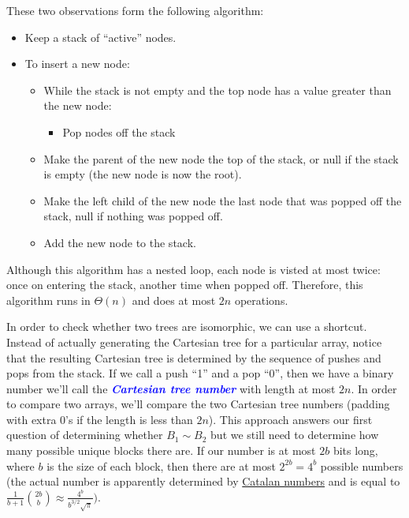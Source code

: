 \documentclass[11pt, oneside]{article}
\newcommand{\emphasis}[1]{\textcolor{blue}{\textbf{\textit{#1}}}}
\begin{document}
These two observations form the following algorithm:
\begin{itemize}
  \item Keep a stack of ``active'' nodes.
  \item To insert a new node:
    \begin{itemize}
      \item While the stack is not empty and the top node has a value greater than the new node:
      \begin{itemize}
        \item Pop nodes off the stack
      \end{itemize}
      \item Make the parent of the new node the top of the stack, or null
      if the stack is empty (the new node is now the root).
      \item Make the left child of the new node the last node that was popped off the stack,
      null if nothing was popped off.
      \item Add the new node to the stack.
    \end{itemize}
\end{itemize}

Although this algorithm has a nested loop, each node is visted at most twice:
once on entering the stack, another time when popped off. Therefore, this algorithm
runs in \( \Theta(n) \) and does at most \( 2n \) operations.

In order to check whether two trees are isomorphic, we can use a shortcut.
Instead of actually generating the Cartesian tree for a particular array, notice that
the resulting Cartesian tree is determined by the sequence of pushes and pops from the stack.
If we call a push ``1'' and a pop ``0'', then we have a binary number we'll call the
\emphasis{Cartesian tree number} with length at most \( 2n \). In order to compare two arrays,
we'll compare the two Cartesian tree numbers (padding with extra 0's if the length is less than \( 2n \)).
This approach answers our first question of determining whether \( B_1 \sim B_2 \) but
we still need to determine how many possible unique blocks there are. If our number is at most \( 2b \) bits long,
where \( b \) is the size of each block, then there are at most \(2^{2b} = 4^b \) possible numbers
(the actual number is apparently determined by \href{https://en.wikipedia.org/wiki/Catalan_number}{Catalan numbers}
and is equal to \( \frac{1}{b + 1} \binom{2b}{b} \approx \frac{4^b}{b^{3/2}\sqrt{\pi}}) \).

\newpage
\end{document}
